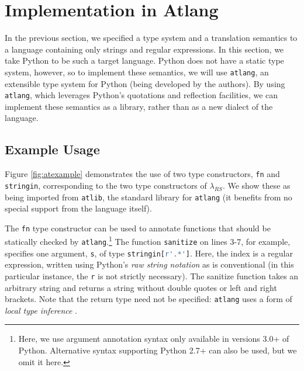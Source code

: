 \documentclass[9pt]{sig-alternate}
\theoremstyle{definition}
\begin{document}

\section{Implementation in {Atlang}}\label{atlang}
In the previous section, we specified a type system and a translation semantics to a language containing only strings and regular expressions. In this section, we take Python to be such a target language. Python does not have a static type system, however, so to implement these semantics, we will use \verb|atlang|, an extensible type system for Python (being developed by the authors). By using \verb|atlang|, which leverages Python's quotations and reflection facilities, we can implement these semantics as a library, rather than as a new dialect of the language. 

\subsection{Example Usage}

\newcommand{\lstinlinep}[1]{\lstinline[language=Python,basicstyle=\ttfamily\small]{#1}}

Figure \ref{fig:atexample} demonstrates the use of two type constructors, \verb|fn| and \verb|stringin|, corresponding to the two type constructors of $\lambda_{RS}$. We show these as being imported from \verb|atlib|, the standard library for \verb|atlang| (it benefits from no special support from the language itself). 

The \verb|fn| type constructor can be used to annotate functions that should be statically checked by \verb|atlang|.\footnote{Here, we use argument annotation syntax only available in versions 3.0+ of Python. Alternative syntax supporting Python 2.7+ can also be used, but we omit it here.} The function \verb|sanitize| on lines 3-7, for example,  specifies one argument, \verb|s|, of type \lstinlinep{stringin[r'.*']}. Here, the index is a regular expression, written using Python's \emph{raw string notation} as is conventional (in this particular instance, the \verb|r| is not strictly necessary). The sanitize function takes an arbitrary string and returns a string without
double quotes or left and right brackets. Note that the return type need not be specified: \verb|atlang| uses a form of \emph{local type inference} \cite{Pierce:2000:LTI:345099.345100}. 
\end{document}
